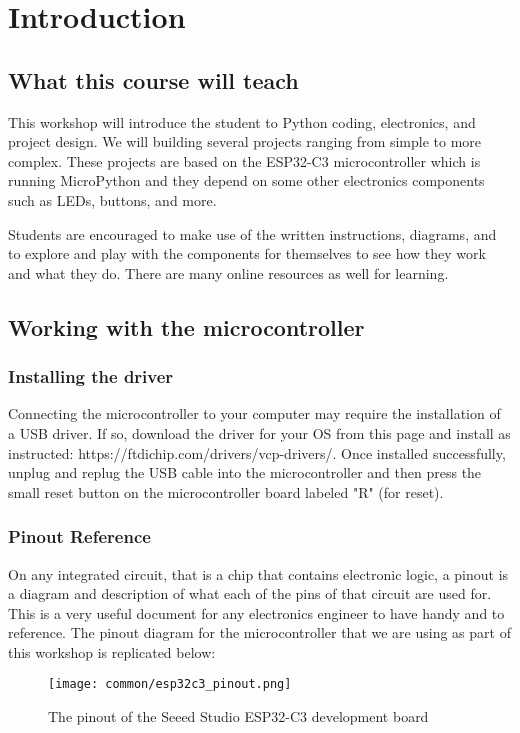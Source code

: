 \chapter{Introduction}
\section{What this course will teach}
This workshop will introduce the student to Python coding, electronics, and project
design. We will building several projects ranging from simple to more complex. These
projects are based on the ESP32-C3 microcontroller which is running MicroPython and
they depend on some other electronics components such as LEDs, buttons, and more.

Students are encouraged to make use of the written instructions, diagrams, and to
explore and play with the components for themselves to see how they work and what
they do. There are many online resources as well for learning.

\section{Working with the microcontroller}
\subsection{Installing the driver}
Connecting the microcontroller to your computer may require the installation of a
USB driver. If so, download the driver for your OS from this page and install as instructed:
https://ftdichip.com/drivers/vcp-drivers/. Once installed successfully, unplug and replug
the USB cable into the microcontroller and then press the small reset button on the
microcontroller board labeled "R" (for reset).

\subsection{Pinout Reference} \label{pinout}
On any integrated circuit, that is a chip that contains electronic logic, a pinout is
a diagram and description of what each of the pins of that circuit are used for. This is
a very useful document for any electronics engineer to have handy and to reference. The
pinout diagram for the microcontroller that we are using as part of this workshop is
replicated below:
\begin{figure}[H]
\centering
    \texttt{[image: common/esp32c3\_pinout.png]}
    \caption{The pinout of the Seeed Studio ESP32-C3 development board}
\end{figure}

